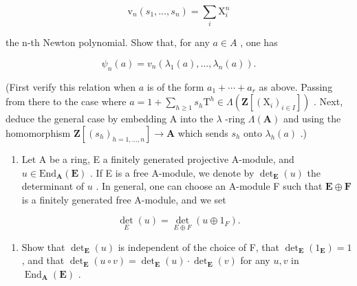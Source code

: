 \[
\mathrm{v} _ {n} (s _ {1}, \dots , s _ {n}) = \sum_ {i} \mathrm{X} _ {i} ^ {n}
\]

the n-th Newton polynomial. Show that, for any \(a \in A\) , one has

\[
\psi_ {n} (a) = v _ {n} \left(\lambda_ {1} (a), \dots , \lambda_ {n} (a)\right).
\]

(First verify this relation when \(a\) is of the form \(a_{1} + \cdots + a_{r}\) as above. Passing from there to the case where \(a = 1 + \sum_{h \geqslant 1} s_{h} \mathrm{T}^{h} \in \Lambda(\mathbf{Z}[(\mathrm{X}_{i})_{i \in I}])\) . Next, deduce the general case by embedding A into the \(\lambda\) -ring \(\Lambda(\mathbf{A})\) and using the homomorphism \(\mathbf{Z}[(s_{h})_{h=1,\ldots,n}] \to \mathbf{A}\) which sends \(s_{h}\) onto \(\lambda_{h}(a)\) .)

\begin{enumerate}
\def\labelenumi{\arabic{enumi})}
\setcounter{enumi}{48}
\tightlist
\item
  Let A be a ring, E a finitely generated projective A-module, and \(u \in \text{End}_{\mathbf{A}}(\mathbf{E})\) . If E is a free A-module, we denote by \(\det_{\mathbf{E}}(u)\) the determinant of \(u\) . In general, one can choose an A-module F such that \(\mathbf{E} \oplus \mathbf{F}\) is a finitely generated free A-module, and we set
\end{enumerate}

\[
\det _ {E} (u) = \det _ {E \oplus F} (u \oplus 1 _ {F}).
\]

\begin{enumerate}
\def\labelenumi{\alph{enumi})}
\tightlist
\item
  Show that \(\operatorname{det}_{\mathbf{E}}(u)\) is independent of the choice of F, that \(\operatorname{det}_{\mathbf{E}}(1_{\mathbf{E}}) = 1\) , and that \(\operatorname{det}_{\mathbf{E}}(u \circ v) = \operatorname{det}_{\mathbf{E}}(u) \cdot \operatorname{det}_{\mathbf{E}}(v)\) for any \(u, v\) in \(\operatorname{End}_{\mathbf{A}}(\mathbf{E})\) .
\end{enumerate}
